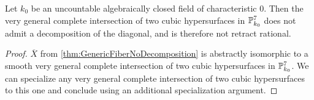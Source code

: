\begin{corollary}
	\label{cor:33NotRetractRational}  
	Let $k_0$ be an uncountable algebraically closed field of characteristic $0$. Then the very general complete intersection of two cubic hypersurfaces in $\P^7_{k_0}$ does not admit a decomposition of the diagonal, and is therefore not retract rational.
\end{corollary}
\begin{proof}
	$\overline{X}$ from \cref{thm:GenericFiberNoDecomposition} is abstractly isomorphic to a smooth very general complete intersection of two cubic hypersurfaces in $\P^7_{k_0}$. We can specialize any very general complete intersection of two cubic hypersurfaces to this one and conclude using an additional specialization argument.
\end{proof}

\printbibliography[heading = subbibliography]
\stopcontents[chapters]